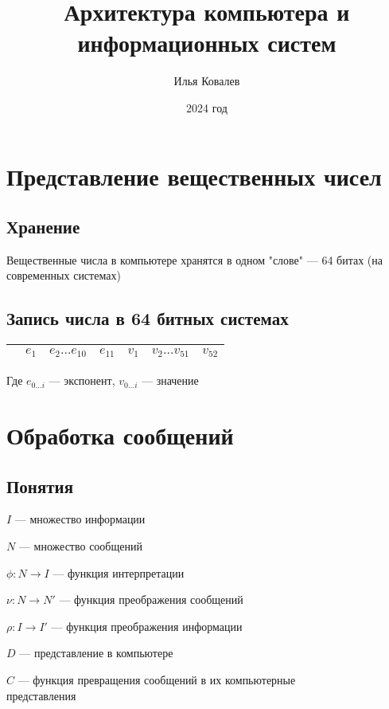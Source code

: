 \documentclass{article}
\begin{document}
\title{Архитектура компьютера и информационных систем}
\author{Илья Ковалев}
\date{2024 год}
\maketitle

\section{Представление вещественных чисел}

\subsection{Хранение}

Вещественные числа в компьютере хранятся в одном "слове" --- 64 битах (на современных системах)

\subsection{Запись числа в 64 битных системах}

\begin{tabular}{|c||c|c|c||c|c|c|}
	\hline
	\text{знак} & $e_1$ & $e_2 \dots e_{10}$ & $e_{11}$ & $v_1$ & $v_2 \dots v_{51}$ & $v_{52}$ \\
	\hline
\end{tabular}

Где $e_{0 \dots i}$ --- экспонент, $v_{0 \dots i}$ --- значение

\section{Обработка сообщений}

\subsection{Понятия}

$I$ --- множество информации

$N$ --- множество сообщений

$\phi: N \rightarrow I$ --- функция интерпретации

$\nu: N \rightarrow N'$ --- функция преображения сообщений

$\rho: I \rightarrow I'$ --- функция преображения информации

$D$ --- представление в компьютере

$C$ --- функция превращения сообщений в их компьютерные \\
представления
\end{document}
